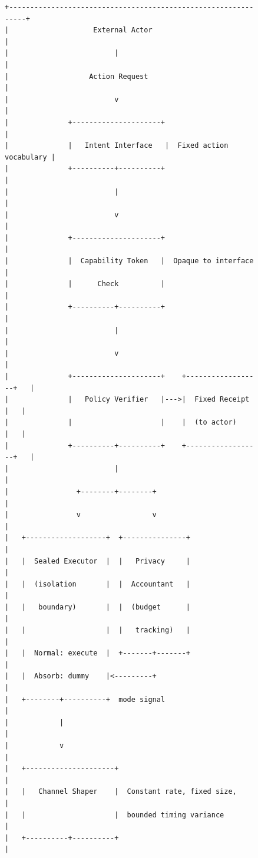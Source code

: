 \documentclass[11pt,a4paper]{article}
\begin{document}
\begin{figure}[h]
\begin{small}
\begin{verbatim}
+---------------------------------------------------------------+
|                    External Actor                              |
|                         |                                      |
|                   Action Request                               |
|                         v                                      |
|              +---------------------+                           |
|              |   Intent Interface   |  Fixed action vocabulary |
|              +----------+----------+                           |
|                         |                                      |
|                         v                                      |
|              +---------------------+                           |
|              |  Capability Token   |  Opaque to interface      |
|              |      Check          |                           |
|              +----------+----------+                           |
|                         |                                      |
|                         v                                      |
|              +---------------------+    +------------------+   |
|              |   Policy Verifier   |--->|  Fixed Receipt   |   |
|              |                     |    |  (to actor)      |   |
|              +----------+----------+    +------------------+   |
|                         |                                      |
|                +--------+--------+                             |
|                v                 v                              |
|   +-------------------+  +---------------+                     |
|   |  Sealed Executor  |  |   Privacy     |                     |
|   |  (isolation       |  |  Accountant   |                     |
|   |   boundary)       |  |  (budget      |                     |
|   |                   |  |   tracking)   |                     |
|   |  Normal: execute  |  +-------+-------+                     |
|   |  Absorb: dummy    |<---------+                             |
|   +--------+----------+  mode signal                           |
|            |                                                   |
|            v                                                   |
|   +---------------------+                                      |
|   |   Channel Shaper    |  Constant rate, fixed size,          |
|   |                     |  bounded timing variance             |
|   +----------+----------+                                      |

\end{verbatim}
\end{small}
\end{figure}
\end{document}
